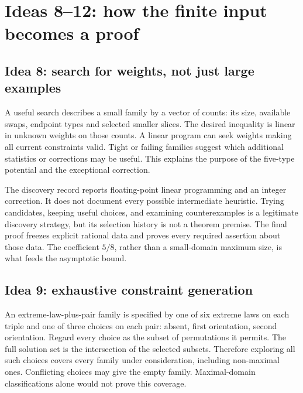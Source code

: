 \section{Ideas 8--12: how the finite input becomes a proof}\label{sec:computation}
\subsection{Idea 8: search for weights, not just large examples}
A useful search describes a small family by a vector of counts:
its size, available swaps, endpoint types and selected smaller slices.
The desired inequality is linear in unknown weights on those counts.
A linear program can seek weights making all current constraints
valid. Tight or failing families suggest which additional statistics
or corrections may be useful. This explains the purpose of the
five-type potential and the exceptional correction.

The discovery record reports floating-point linear programming and
an integer correction. It does not document every possible intermediate
heuristic. Trying candidates, keeping useful choices, and examining
counterexamples is a legitimate discovery strategy, but its selection
history is not a theorem premise. The final proof freezes explicit
rational data and proves every required assertion about those data.
The coefficient \(5/8\), rather than a small-domain maximum size,
is what feeds the asymptotic bound.

\subsection{Idea 9: exhaustive constraint generation}
An extreme-law-plus-pair family is specified by one of six extreme
laws on each triple and one of three choices on each pair: absent,
first orientation, second orientation. Regard every choice as the
subset of permutations it permits. The full solution set is the
intersection of the selected subsets. Therefore exploring all such
choices covers every family under consideration, including
non-maximal ones. Conflicting choices may give the empty family.
Maximal-domain classifications alone would not prove this coverage.


